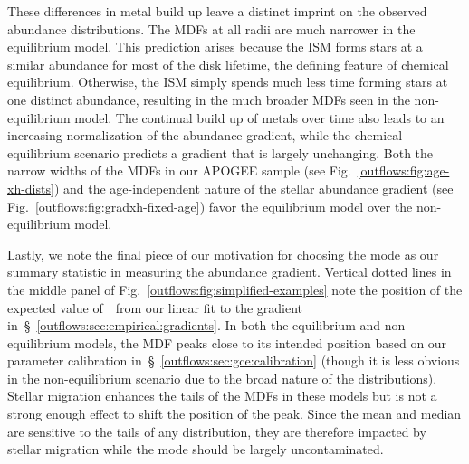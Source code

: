 These differences in metal build up leave a distinct imprint on the observed
abundance distributions.
The MDFs at all radii are much narrower in the equilibrium model.
This prediction arises because the ISM forms stars at a similar abundance for
most of the disk lifetime, the defining feature of chemical equilibrium.
Otherwise, the ISM simply spends much less time forming stars at one
distinct abundance, resulting in the much broader MDFs seen in the
non-equilibrium model.
The continual build up of metals over time also leads to an increasing
normalization of the abundance gradient, while the chemical equilibrium
scenario predicts a gradient that is largely unchanging.
Both the narrow widths of the MDFs in our APOGEE sample (see
Fig.~\ref{outflows:fig:age-xh-dists}) and the age-independent nature of the
stellar abundance gradient (see Fig.~\ref{outflows:fig:gradxh-fixed-age})
favor the equilibrium model over the non-equilibrium model.
\par
Lastly, we note the final piece of our motivation for choosing the mode as our
summary statistic in measuring the abundance gradient.
Vertical dotted lines in the middle panel of
Fig.~\ref{outflows:fig:simplified-examples} note the position of the expected
value of~\oh~from our linear fit to the gradient
in~\S~\ref{outflows:sec:empirical:gradients}.
In both the equilibrium and non-equilibrium models, the MDF peaks close to its
intended position based on our parameter calibration
in~\S~\ref{outflows:sec:gce:calibration} (though it is less obvious in the
non-equilibrium scenario due to the broad nature of the distributions).
Stellar migration enhances the tails of the MDFs in these models but is not
a strong enough effect to shift the position of the peak.
Since the mean and median are sensitive to the tails of any distribution, they
are therefore impacted by stellar migration while the mode should be largely
uncontaminated.


